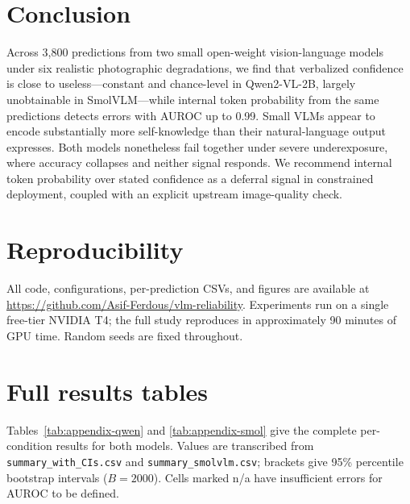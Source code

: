 \documentclass[11pt]{article}
\begin{document}
\section{Conclusion}

Across 3{,}800 predictions from two small open-weight vision-language models
under six realistic photographic degradations, we find that verbalized
confidence is close to useless---constant and chance-level in Qwen2-VL-2B,
largely unobtainable in SmolVLM---while internal token probability from the same
predictions detects errors with AUROC up to 0.99. Small VLMs appear to encode
substantially more self-knowledge than their natural-language output expresses.
Both models nonetheless fail together under severe underexposure, where accuracy
collapses and neither signal responds. We recommend internal token probability
over stated confidence as a deferral signal in constrained deployment, coupled
with an explicit upstream image-quality check.

\section{Reproducibility}

All code, configurations, per-prediction CSVs, and figures are available at
\url{https://github.com/Asif-Ferdous/vlm-reliability}. Experiments run on a single free-tier NVIDIA T4; the
full study reproduces in approximately 90 minutes of GPU time. Random seeds are
fixed throughout.




\appendix

\section{Full results tables}
Tables~\ref{tab:appendix-qwen} and \ref{tab:appendix-smol} give the complete
per-condition results for both models. Values are transcribed from
\texttt{summary\_with\_CIs.csv} and \texttt{summary\_smolvlm.csv}; brackets give
95\% percentile bootstrap intervals ($B=2000$). Cells marked n/a have
insufficient errors for AUROC to be defined.
\end{document}
